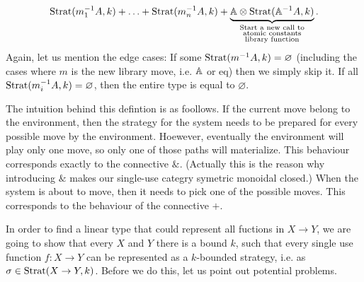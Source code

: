 \begin{definition}
\begin{itemize}
\begin{itemize}
               \begin{align*}
                \text{Strat}(m_1^{-1}A, k) + \ldots + \text{Strat}(m_n^{-1}A, k) + \underbrace{\mathbb A \otimes \text{Strat}(\mathbb A^{-1}A, k)}_{\substack{\textrm{Start a new call to}\\
                \textrm{atomic constants}\\
                \textrm{library function}}}.
               \end{align*}
               Again, let us mention the edge cases: If some $\text{Strat}(m^{-1}A, k) = \varnothing$ (including the cases where $m$ is the new library move, i.e. $\mathbb A$ or $\text{eq}$)
               then we simply skip it. If all $\text{Strat}(m_i^{-1}A, k) = \varnothing$, then the entire type is equal to $\varnothing$. 
    \end{itemize}
\end{itemize}
\end{definition}
The intuition behind this defintion is as foollows. If the current move belong to the environment, then the strategy 
for the system needs to be prepared for every possible move by the environment. Hoewever, eventually the environment 
will play only one move, so only one of those paths will materialize. This behaviour corresponds exactly to the connective $\&$. 
(Actually this is the reason why introducing $\&$ makes our single-use categry symetric monoidal closed.) 
When the system is about to move, then it needs to pick one of the possible moves. This corresponds to the behaviour of the connective $+$.

In order to find a linear type that could represent all fuctions in $X \to Y$, we are going to show 
that every $X$ and $Y$ there is a bound $k$, such that every single use function $f : X \to Y$
can be represented as a $k$-bounded strategy, i.e. as $\sigma \in \text{Strat}(X \to Y, k)$. Before we do this, 
let us point out potential problems. 

